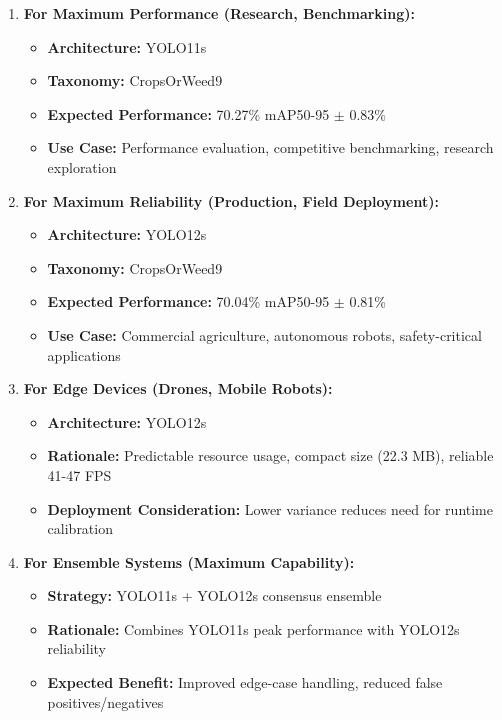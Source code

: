 \begin{enumerate}
    \item \textbf{For Maximum Performance (Research, Benchmarking):}
    \begin{itemize}
        \item \textbf{Architecture:} YOLO11s
        \item \textbf{Taxonomy:} CropsOrWeed9
        \item \textbf{Expected Performance:} 70.27\% mAP50-95 $\pm$ 0.83\%
        \item \textbf{Use Case:} Performance evaluation, competitive benchmarking, research exploration
    \end{itemize}
    
    \item \textbf{For Maximum Reliability (Production, Field Deployment):}
    \begin{itemize}
        \item \textbf{Architecture:} YOLO12s
        \item \textbf{Taxonomy:} CropsOrWeed9
        \item \textbf{Expected Performance:} 70.04\% mAP50-95 $\pm$ 0.81\%
        \item \textbf{Use Case:} Commercial agriculture, autonomous robots, safety-critical applications
    \end{itemize}
    
    \item \textbf{For Edge Devices (Drones, Mobile Robots):}
    \begin{itemize}
        \item \textbf{Architecture:} YOLO12s
        \item \textbf{Rationale:} Predictable resource usage, compact size (22.3 MB), reliable 41-47 FPS
        \item \textbf{Deployment Consideration:} Lower variance reduces need for runtime calibration
    \end{itemize}
    
    \item \textbf{For Ensemble Systems (Maximum Capability):}
    \begin{itemize}
        \item \textbf{Strategy:} YOLO11s + YOLO12s consensus ensemble
        \item \textbf{Rationale:} Combines YOLO11s peak performance with YOLO12s reliability
        \item \textbf{Expected Benefit:} Improved edge-case handling, reduced false positives/negatives
    \end{itemize}
\end{enumerate}

